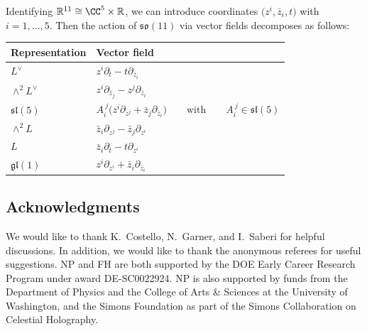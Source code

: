 \documentclass[pdftex]{sigma}
\numberwithin{equation}{section}
\theoremstyle{definition}
\def\R{\mathbb{R}}
\def\lie#1{\ensuremath{\mathfrak{#1}}}
\def\so{\lie{so}}
\begin{document}
Identifying $\R^{11} \cong \CC^5 \times \R$, we can introduce coordinates $\big(z^i, \bar{z}_i , t\big)$ with $i=1,\dots, 5$. Then the action of $\so(11)$ via vector fields decomposes as follows:
\begin{table}[!ht]\renewcommand{\arraystretch}{1.2}
\centering
\begin{tabular}{|l|l|}
\hline
Representation & Vector field \\ \hline
\( L^\vee \) & \( z^i \partial_t - t \partial_{\bar{z}_i} \) \\
\hline
\( \wedge^2 L^\vee \) & \( z^i \partial_{\bar{z}_j} - z^j \partial_{\bar{z}_i} \) \\ \hline
\( \mathfrak{sl}(5) \) & \( A_{i}^{\ j} \big(z^i \partial_{z^j} + \bar{z}_j \partial_{\bar{z}_i}\big) \qquad \text{with} \qquad A_{i}^{\ j} \in \mathfrak{sl}(5) \) \\
\hline
\( \wedge^2 L \) & \( \bar{z}_i \partial_{z^j} - \bar{z}_j \partial_{z^i} \) \\
\hline
\( L \) & \( \bar{z}_i \partial_t - t \partial_{z^i}\) \\
\hline
\( \mathfrak{gl}(1) \) & \(z^i \partial_{z^i} + \bar{z}_i \partial_{\bar{z}_i}\) \\
\hline
\end{tabular}
\end{table}

\subsection*{Acknowledgments}
We would like to thank K.~Costello, N.~Garner, and I.~Saberi for helpful discussions. In addition, we would like to thank the anonymous referees for useful suggestions. NP and FH are both supported by the DOE Early Career Research Program under award DE-SC0022924. NP is also supported by funds from the Department of Physics and the College of Arts \& Sciences at the University of Washington, and the Simons Foundation as part of the Simons Collaboration on Celestial Holography.
\end{document}
